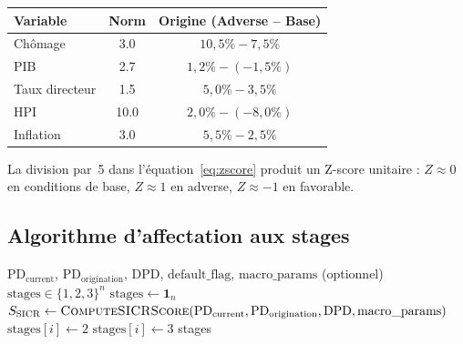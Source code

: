 \documentclass[12pt,a4paper]{article}
\begin{document}
\begin{center}
\begin{tabular}{lcc}
\toprule
\textbf{Variable} & \textbf{Norm} & \textbf{Origine (Adverse -- Base)} \\
\midrule
Ch\^omage         & 3.0  & $10{,}5\% - 7{,}5\%$ \\
PIB               & 2.7  & $1{,}2\% - (-1{,}5\%)$ \\
Taux directeur    & 1.5  & $5{,}0\% - 3{,}5\%$ \\
HPI               & 10.0 & $2{,}0\% - (-8{,}0\%)$ \\
Inflation         & 3.0  & $5{,}5\% - 2{,}5\%$ \\
\bottomrule
\end{tabular}
\end{center}

La division par~5 dans l'\'equation~\eqref{eq:zscore} produit un Z-score unitaire : $Z \approx 0$ en conditions de base, $Z \approx 1$ en adverse, $Z \approx -1$ en favorable.

\subsection{Algorithme d'affectation aux stages}

\begin{algorithm}[H]
\caption{Affectation aux stages IFRS 9 (\texttt{StagingEngine.assign\_stages})}
\label{alg:staging}
\begin{algorithmic}[1]
\Require $\text{PD}_{\text{current}}$, $\text{PD}_{\text{origination}}$, $\text{DPD}$, $\text{default\_flag}$, $\text{macro\_params}$ (optionnel)
\Ensure $\text{stages} \in \{1, 2, 3\}^n$
\State $\text{stages} \gets \mathbf{1}_n$ 
\State $S_{\text{SICR}} \gets \textsc{ComputeSICRScore}(\text{PD}_{\text{current}}, \text{PD}_{\text{origination}}, \text{DPD}, \text{macro\_params})$
     
        \State $\text{stages}[i] \gets 2$
    \EndIf
\EndFor
{} 
        \State $\text{stages}[i] \gets 3$
    \EndIf
\EndFor
\State \Return stages
\end{algorithmic}
\end{algorithm}
\end{document}

